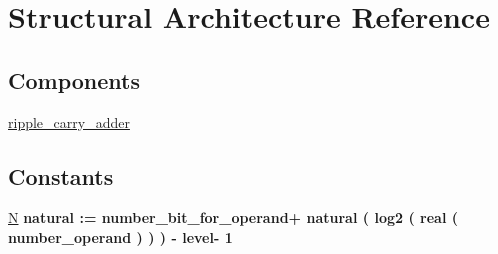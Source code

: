 \hypertarget{classadder__block_1_1_structural}{\section{Structural Architecture Reference}
\label{classadder__block_1_1_structural}
}
\subsection*{Components}
 \begin{DoxyCompactItemize}
\item 
\hypertarget{classadder__block_1_1_structural_gaa3a0644d51d33858d165586a5fbb42e1}{\hyperlink{group___majority_voter_gaa3a0644d51d33858d165586a5fbb42e1}{ripple\+\_\+carry\+\_\+adder}  {\bfseries }  }\label{classadder__block_1_1_structural_gaa3a0644d51d33858d165586a5fbb42e1}

\end{DoxyCompactItemize}
\subsection*{Constants}
 \begin{DoxyCompactItemize}
\item 
\hypertarget{classadder__block_1_1_structural_gad3f7d3a495e10fb501393b29e545970c}{\hyperlink{group___majority_voter_gad3f7d3a495e10fb501393b29e545970c}{N} {\bfseries \textcolor{vhdlchar}{natural}\textcolor{vhdlchar}{ }\textcolor{vhdlchar}{ }\textcolor{vhdlchar}{\+:}\textcolor{vhdlchar}{=}\textcolor{vhdlchar}{ }\textcolor{vhdlchar}{ }\textcolor{vhdlchar}{ }\textcolor{vhdlchar}{ }\textcolor{vhdlchar}{number\+\_\+bit\+\_\+for\+\_\+operand}\textcolor{vhdlchar}{+}\textcolor{vhdlchar}{ }\textcolor{vhdlchar}{ }\textcolor{vhdlchar}{ }\textcolor{vhdlchar}{natural}\textcolor{vhdlchar}{ }\textcolor{vhdlchar}{(}\textcolor{vhdlchar}{ }\textcolor{vhdlchar}{log2}\textcolor{vhdlchar}{ }\textcolor{vhdlchar}{(}\textcolor{vhdlchar}{ }\textcolor{vhdlchar}{real}\textcolor{vhdlchar}{ }\textcolor{vhdlchar}{(}\textcolor{vhdlchar}{ }\textcolor{vhdlchar}{number\+\_\+operand}\textcolor{vhdlchar}{ }\textcolor{vhdlchar}{ }\textcolor{vhdlchar}{)}\textcolor{vhdlchar}{ }\textcolor{vhdlchar}{ }\textcolor{vhdlchar}{ }\textcolor{vhdlchar}{)}\textcolor{vhdlchar}{ }\textcolor{vhdlchar}{ }\textcolor{vhdlchar}{ }\textcolor{vhdlchar}{)}\textcolor{vhdlchar}{ }\textcolor{vhdlchar}{-\/}\textcolor{vhdlchar}{ }\textcolor{vhdlchar}{ }\textcolor{vhdlchar}{ }\textcolor{vhdlchar}{level}\textcolor{vhdlchar}{-\/}\textcolor{vhdlchar}{ } \textcolor{vhdldigit}{1} \textcolor{vhdlchar}{ }} }\label{classadder__block_1_1_structural_gad3f7d3a495e10fb501393b29e545970c}

\end{DoxyCompactItemize}
